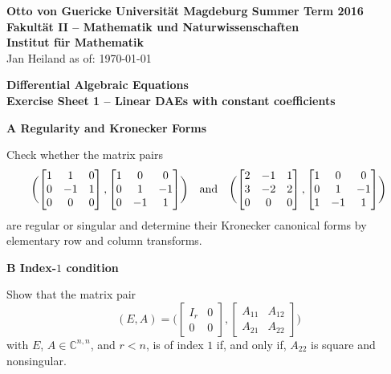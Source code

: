 \documentclass[a4paper,10pt]{article}
\begin{document}
{\bf Otto von Guericke Universit{\"a}t Magdeburg \hfill Summer Term 2016} \\
{\bf Fakult\"at II -- Mathematik und Naturwissenschaften} \\
{\bf Institut f\"ur Mathematik} \\
Jan Heiland \hfill as of: \today \\


\bigskip
\begin{center}
\textbf{\large Differential Algebraic Equations}\\
\smallskip
\textbf{Exercise Sheet 1 -- Linear DAEs with constant coefficients}\\
\end{center}

\bigskip


{\bf A Regularity and Kronecker Forms}

Check whether the matrix pairs 
\begin{equation*}
	\biggl( 
\begin{bmatrix} 1 & 1 &0 \\ 0 &-1 &1 \\ 0 &0 &0 \end{bmatrix},
\begin{bmatrix} 1  &0 &0 \\ 0 &1 &-1 \\ 0 &-1 &1 \end{bmatrix}
	\biggr)
	\quad \text{and} \quad
	\biggl( 
\begin{bmatrix} 2 &-1 &1 \\ 3 &-2 &2 \\ 0 &0 &0 \end{bmatrix},
\begin{bmatrix} 1 &0 &0 \\ 0 &1 &-1 \\ 1 &-1 &1 \end{bmatrix}
	\biggr)
\end{equation*}
are regular or singular and determine their Kronecker canonical forms by elementary row and column transforms.
\smallskip

{\bf B Index-$1$ condition}

Show that the matrix pair 
\begin{equation*}
	(E, A) = 
	\biggl( 
\begin{bmatrix} I_r &0 \\ 0 &0 \end{bmatrix}, 
	\begin{bmatrix} A_{11} & A_{12} \\ A_{21} & A_{22} \end{bmatrix}
	\biggr)
\end{equation*}
with $E$, $A\in \mathbb C^{n,n}$, and $r<n$, is of index $1$ if, and only if, $A_{22}$ is square and nonsingular.
\end{document}
